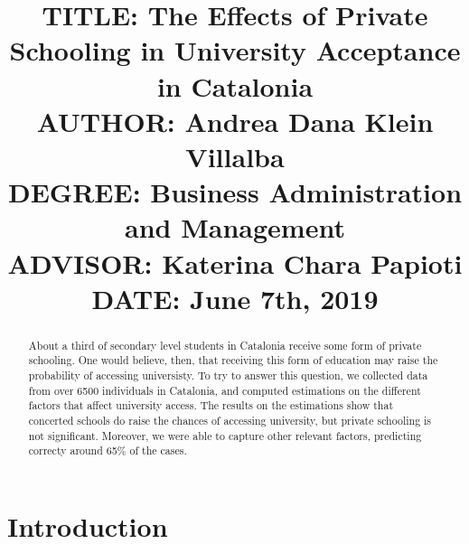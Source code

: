 \documentclass[12pt]{article}
\begin{document}

\title{{\large TITLE: The Effects of Private Schooling in University Acceptance in Catalonia\\
AUTHOR: Andrea Dana Klein Villalba\\
DEGREE: Business Administration and Management\\
ADVISOR: Katerina Chara Papioti\\
DATE: June 7th, 2019\\}}
\date{}

\clearpage\maketitle
\thispagestyle{empty}
\newpage

\begin{abstract}
About a third of secondary level students in Catalonia receive some form of private schooling. One would believe, then, that receiving this form of education may raise the probability of accessing universisty. To try to answer this question, we collected data from over 6500 individuals in Catalonia, and computed estimations on the different factors that affect university access. The results on the estimations show that concerted schools do raise the chances of accessing university, but private schooling is not significant. Moreover, we were able to capture other relevant factors, predicting correcty around 65\% of the cases.
\end{abstract}
\newpage

 \tableofcontents
 \newpage

\section{Introduction}
\end{document}
